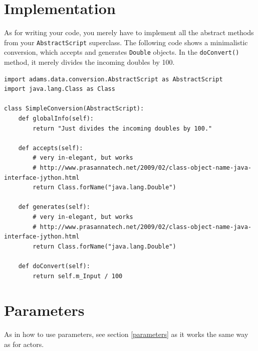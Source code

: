 \documentclass[a4paper]{book}
\begin{document}
\newpage
\section{Implementation}
As for writing your code, you merely have to implement all the abstract methods
from your \texttt{AbstractScript} superclass. The following code shows a
minimalistic conversion, which accepts and generates \texttt{Double}
objects. In the \texttt{doConvert()} method, it merely divides the incoming
doubles by 100.
\begin{verbatim}
import adams.data.conversion.AbstractScript as AbstractScript
import java.lang.Class as Class

class SimpleConversion(AbstractScript):
    def globalInfo(self):
        return "Just divides the incoming doubles by 100."

    def accepts(self):
        # very in-elegant, but works
        # http://www.prasannatech.net/2009/02/class-object-name-java-interface-jython.html
        return Class.forName("java.lang.Double")

    def generates(self):
        # very in-elegant, but works
        # http://www.prasannatech.net/2009/02/class-object-name-java-interface-jython.html
        return Class.forName("java.lang.Double")

    def doConvert(self):
        return self.m_Input / 100
\end{verbatim}
\section{Parameters}
As in how to use parameters, see section \ref{parameters} as it works the
same way as for actors.


\end{document}
